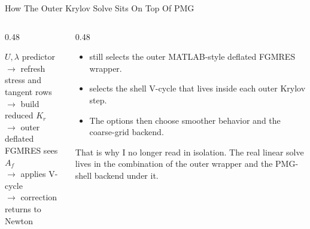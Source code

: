 \documentclass[aspectratio=169,10pt]{beamer}
\begin{document}
\begin{frame}{How The Outer Krylov Solve Sits On Top Of PMG}
\small
\begin{columns}[T,totalwidth=\textwidth]
\begin{column}{0.48\textwidth}
\begin{pseudobox}
\(U,\lambda\) predictor\\
$\rightarrow$ refresh stress and tangent rows\\
$\rightarrow$ build reduced \(K_r\)\\
$\rightarrow$ outer deflated FGMRES sees \(A_f\)\\
$\rightarrow$  applies V-cycle\\
$\rightarrow$ correction returns to Newton
\end{pseudobox}
\end{column}
\begin{column}{0.48\textwidth}
\begin{softbox}
\begin{itemize}
  \item {} still selects the outer MATLAB-style deflated FGMRES wrapper.
  \item {} selects the shell V-cycle that lives inside each outer Krylov step.
  \item The  options then choose smoother behavior and the coarse-grid backend.
\end{itemize}
\end{softbox}
\vspace{0.12cm}
\begin{callout}
That is why I no longer read  in isolation. The real linear solve lives in the combination of the outer wrapper and the PMG-shell backend under it.
\end{callout}
\end{column}
\end{columns}
\end{frame}
\end{document}
